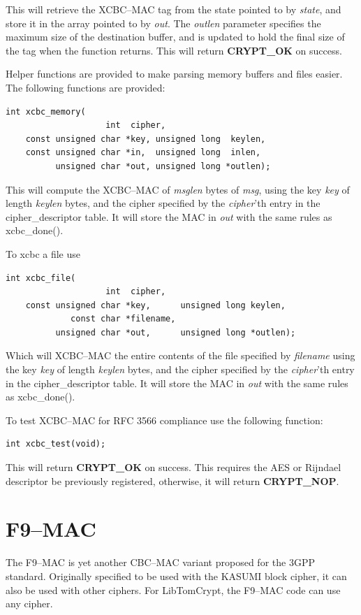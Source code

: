 \documentclass[synpaper]{book}
\newcommand{\mysection}[1]    %
	{                   %
	\section{#1}
   \markboth{\textsf{www.libtom.net}}{\thesection ~ {#1}}
	}
\begin{document}
This will retrieve the XCBC--MAC tag from the state pointed to by \textit{state}, and store it in the array pointed to by \textit{out}.  The \textit{outlen} parameter
specifies the maximum size of the destination buffer, and is updated to hold the final size of the tag when the function returns.  This will return \textbf{CRYPT\_OK} on success.

Helper functions are provided to make parsing memory buffers and files easier.  The following functions are provided:

\begin{verbatim}
int xcbc_memory(
                    int  cipher,
    const unsigned char *key, unsigned long  keylen,
    const unsigned char *in,  unsigned long  inlen,
          unsigned char *out, unsigned long *outlen);
\end{verbatim}
This will compute the XCBC--MAC of \textit{msglen} bytes of \textit{msg}, using the key \textit{key} of length \textit{keylen} bytes, and the cipher
specified by the \textit{cipher}'th entry in the cipher\_descriptor table.  It will store the MAC in \textit{out} with the same rules as xcbc\_done().

To xcbc a file use
\begin{verbatim}
int xcbc_file(
                    int  cipher,
    const unsigned char *key,      unsigned long keylen,
             const char *filename,
          unsigned char *out,      unsigned long *outlen);
\end{verbatim}

Which will XCBC--MAC the entire contents of the file specified by \textit{filename} using the key \textit{key} of length \textit{keylen} bytes, and the cipher
specified by the \textit{cipher}'th entry in the cipher\_descriptor table.  It will store the MAC in \textit{out} with the same rules as xcbc\_done().


To test XCBC--MAC for RFC 3566 compliance use the following function:

\begin{verbatim}
int xcbc_test(void);
\end{verbatim}

This will return \textbf{CRYPT\_OK} on success.  This requires the AES or Rijndael descriptor be previously registered, otherwise, it will return
\textbf{CRYPT\_NOP}.

\mysection{F9--MAC}
The F9--MAC is yet another CBC--MAC variant proposed for the 3GPP standard.  Originally specified to be used with the KASUMI block cipher, it can also be used
with other ciphers.  For LibTomCrypt, the F9--MAC code can use any cipher.
\end{document}
